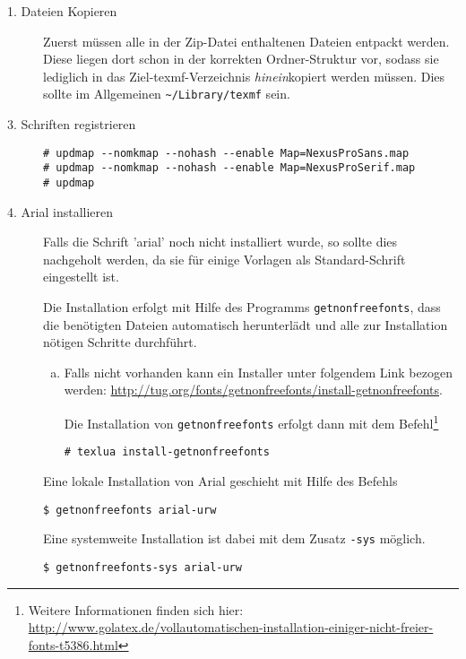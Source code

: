 \begin{description}
  \item[1. Dateien Kopieren] Zuerst müssen alle in der Zip-Datei enthaltenen
    Dateien entpackt werden.
    Diese liegen dort schon in der korrekten Ordner-Struktur vor, sodass
    sie lediglich in das Ziel-texmf-Verzeichnis \emph{hinein}kopiert werden
    müssen.
    Dies sollte im Allgemeinen \lstinline{~/Library/texmf} sein.

  \item[3. Schriften registrieren]\hfill
    \begin{lstlisting}
# updmap --nomkmap --nohash --enable Map=NexusProSans.map
# updmap --nomkmap --nohash --enable Map=NexusProSerif.map
# updmap
    \end{lstlisting}


  \item[4. Arial installieren]\hfill
    Falls die Schrift 'arial' noch nicht installiert wurde, so sollte dies
    nachgeholt werden, da sie für einige Vorlagen als Standard-Schrift
    eingestellt ist.
    
    Die Installation erfolgt mit Hilfe des Programms \lstinline{getnonfreefonts},
    dass die benötigten Dateien automatisch herunterlädt und alle zur Installation
    nötigen Schritte durchführt.
    \begin{enumerate}[a)]
      \item Falls nicht vorhanden kann ein Installer unter folgendem Link
        bezogen werden:
        \url{http://tug.org/fonts/getnonfreefonts/install-getnonfreefonts}.
    
        Die Installation von \lstinline{getnonfreefonts} erfolgt dann mit dem
        Befehl\footnote{Weitere Informationen finden sich hier:\\
          \url{http://www.golatex.de/vollautomatischen-installation-einiger-nicht-freier-fonts-t5386.html}}
        \begin{lstlisting}
# texlua install-getnonfreefonts
        \end{lstlisting}
    \end{enumerate}

    Eine lokale Installation von Arial geschieht mit Hilfe des Befehls
    \begin{lstlisting}
$ getnonfreefonts arial-urw
    \end{lstlisting}
    
    Eine systemweite Installation ist dabei mit dem Zusatz \lstinline{-sys}
    möglich.
    \begin{lstlisting}
$ getnonfreefonts-sys arial-urw
    \end{lstlisting}

\end{description}




